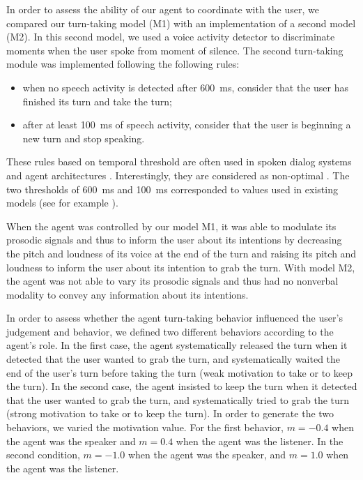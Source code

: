 In order to assess the ability of our agent to coordinate with the user, we compared our turn-taking model (M1) with an implementation of a second model (M2). 
In this second model, we used a voice activity detector to discriminate moments when the user spoke from moment of silence. 
The second turn-taking module was implemented following the following rules: 
\begin{itemize}
\item when no speech activity is detected after 600~ms, consider that the user has finished its turn and take the turn;
\item after at least 100~ms of speech activity, consider that the user is beginning a new turn and stop speaking. 
\end{itemize} 
These rules based on temporal threshold are often used in spoken dialog systems and agent architectures \citep{ward_root_2005}. Interestingly, they are considered as non-optimal \citep{ward_root_2005}. The two thresholds of 600~ms and 100~ms corresponded to values used in existing models (see for example \citep{ferrer_is_2002}). 

When the agent was controlled by our model M1, it was able to modulate its prosodic signals and thus to inform the user about its intentions by decreasing the pitch and loudness of its voice at the end of the turn and raising its pitch and loudness to inform the user about its intention to grab the turn.  
With model M2, the agent was not able to vary its prosodic signals and thus had no nonverbal modality to convey any information about its intentions. 

In order to assess whether the agent turn-taking behavior influenced the user's judgement and behavior, we defined two different behaviors according to the agent's role. In the first case, the agent systematically released the turn when it detected that the user wanted to grab the turn, and systematically waited the end of the user's turn before taking the turn (weak motivation to take or to keep the turn). In the second case, the agent insisted to keep the turn when it detected that the user wanted to grab the turn, and systematically tried to grab the turn (strong motivation to take or to keep the turn). In order to generate the two behaviors, we varied the motivation value. 
For the first behavior, $m=-0.4$ when the agent was the speaker and $m=0.4$ when the agent was the listener. In the second condition, $m=-1.0$ when the agent was the speaker, and $m=1.0$ when the agent was the listener.

